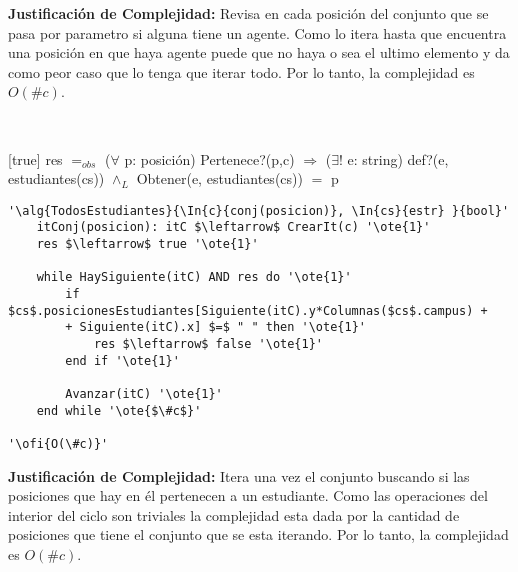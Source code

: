 \textbf{Justificación de Complejidad:} Revisa en cada posición del conjunto que se pasa por parametro si alguna tiene un agente. Como lo itera hasta que encuentra una posición en que haya agente puede que no haya o sea el ultimo elemento y da como peor caso que lo tenga que iterar todo. Por lo tanto, la complejidad es $O(\#c)$.

~


[true]
{res $=_{obs}$ ($\forall$ p: posición) Pertenece?(p,c) $\Rightarrow$ ($\exists!$ e: string) def?(e, estudiantes(cs)) $\land_L$ Obtener(e, estudiantes(cs)) $=$ p}

\begin{lstlisting}[mathescape]
'\alg{TodosEstudiantes}{\In{c}{conj(posicion)}, \In{cs}{estr} }{bool}'
	itConj(posicion): itC $\leftarrow$ CrearIt(c) '\ote{1}'
	res $\leftarrow$ true '\ote{1}'

	while HaySiguiente(itC) AND res do '\ote{1}'
		if $cs$.posicionesEstudiantes[Siguiente(itC).y*Columnas($cs$.campus) +
		+ Siguiente(itC).x] $=$ " " then '\ote{1}'
			res $\leftarrow$ false '\ote{1}'
		end if '\ote{1}'

		Avanzar(itC) '\ote{1}'
	end while '\ote{$\#c$}'

'\ofi{O(\#c)}'
\end{lstlisting}

\textbf{Justificación de Complejidad:} Itera una vez el conjunto buscando si las posiciones que hay en él pertenecen a un estudiante. Como las operaciones del interior del ciclo son triviales la complejidad esta dada por la cantidad de posiciones que tiene el conjunto que se esta iterando. Por lo tanto, la complejidad es $O(\#c)$.

~

